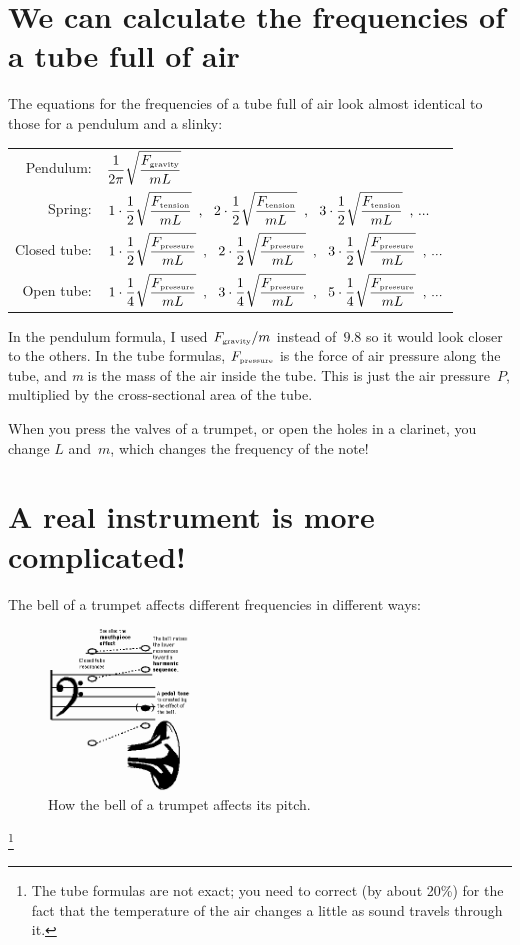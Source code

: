\documentclass{article}
\begin{document}
\section*{We can calculate the frequencies of a tube full of air}
The equations for the frequencies of a tube full of air look almost
identical to those for a pendulum and a slinky:

\begin{tabular}{rl}
Pendulum: & $\displaystyle {1 \over 2\pi} \sqrt{F_{\hbox{\tiny{gravity}}} \over m L}$ \\
Spring: &
 $\displaystyle 1\cdot{1 \over 2} \sqrt{F_{\hbox{\tiny{tension}}} \over m L}\,\,\,\hbox{, }\,\,\,
 2\cdot{1 \over 2} \sqrt{F_{\hbox{\tiny{tension}}} \over m L}\,\,\,\hbox{, }\,\,\,
 3\cdot{1 \over 2} \sqrt{F_{\hbox{\tiny{tension}}} \over m L}\,\,\,\hbox{, ...}$ \\
Closed tube: &
 $\displaystyle 1\cdot{1 \over 2} \sqrt{F_{\hbox{\tiny{pressure}}} \over m L}\,\,\,\hbox{, }\,\,\,
 2\cdot{1 \over 2} \sqrt{F_{\hbox{\tiny{pressure}}} \over m L}\,\,\,\hbox{, }\,\,\,
 3\cdot{1 \over 2} \sqrt{F_{\hbox{\tiny{pressure}}} \over m L}\,\,\,\hbox{, ...}$ \\
Open tube: &
 $\displaystyle 1\cdot{1 \over 4} \sqrt{F_{\hbox{\tiny{pressure}}} \over m L}\,\,\,\hbox{, }\,\,\,
 3\cdot{1 \over 4} \sqrt{F_{\hbox{\tiny{pressure}}} \over m L}\,\,\,\hbox{, }\,\,\,
 5\cdot{1 \over 4} \sqrt{F_{\hbox{\tiny{pressure}}} \over m L}\,\,\,\hbox{, ...}$
\end{tabular}

In the pendulum formula, I used $F_{\hbox{\tiny{gravity}}}/m$ instead
of~$9.8$ so it would look closer to the others.  In the tube formulas,
$F_{\hbox{\tiny{pressure}}}$ is the force of air pressure along the
tube, and {\it m\/} is the mass of the air inside the
tube.  This is just the air pressure~$P$, multiplied by the
cross-sectional area of the tube.

When you press the valves of a trumpet, or open the holes in a
clarinet, you change $L$ and~$m$, which changes the frequency of the
note!

\section*{A real instrument is more complicated!}
The bell of a trumpet affects different frequencies in different ways:

\begin{figure}[h]
\begin{center}
	\includegraphics[width=1.5in]{figures/brass.png}
	\caption{How the bell of a trumpet affects its pitch.}
\end{center}
\end{figure}


\footnote{The tube formulas are not exact; you need to correct
(by about 20\%) for the fact that the temperature of the air changes a
little as sound travels through it.}
\end{document}
